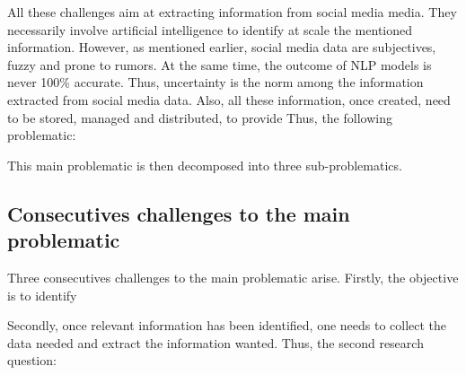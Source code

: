 All these challenges aim at extracting information from social media media.
They necessarily involve artificial intelligence to identify at scale the mentioned information.
However, as mentioned earlier, social media data are subjectives, fuzzy and prone to rumors.
At the same time, the outcome of NLP models is never 100\% accurate.
Thus, uncertainty is the norm among the information extracted from social media data.
Also, all these information, once created, need to be stored, managed and distributed, to provide
Thus, the following problematic:

\begin{center}
\end{center}

This main problematic is then decomposed into three sub-problematics.

\subsection{Consecutives challenges to the main problematic}
Three consecutives challenges to the main problematic arise.
Firstly, the objective is to identify

\begin{center}
\end{center}

Secondly, once relevant information has been identified, one needs to collect the data needed and
extract the information wanted. Thus, the second research question:

\begin{center}
\end{center}

